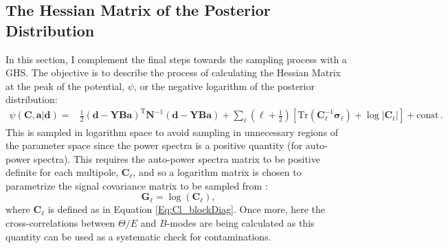 \subsection{The Hessian Matrix of the Posterior Distribution}\label{Sec:BPL:Hessian}
In this section, I complement the final steps towards the sampling process with a GHS. The objective is to describe the process of calculating the Hessian Matrix at the peak of the potential, $\psi$, or the negative logarithm of the posterior distribution: 
\begin{align}
\psi(\mathbf{C},\mathbf{a}|\mathbf{d}) = & \frac{1}{2}(\mathbf{d}-\mathbf{YBa})^{\mathrm{T}}\mathbf{N}^{-1}(\mathbf{d}-\mathbf{YBa})+\sum_{\ell}\left( {\ell}+\frac{1}{2}\right)\left[ \mathrm{Tr}(\mathbf{C}_{\ell}^{-1}\boldsymbol{\sigma}_{\ell}) + \log\left|\mathbf{C}_{\ell} \right|\right] + \mathrm{const}\, .
\end{align}
This is sampled in logarithm space to avoid sampling in unnecessary regions of the parameter space since the power spectra is a positive quantity (for auto-power spectra). This requires the auto-power spectra matrix to be positive definite for each multipole, $\mathbf{C}_{\ell}$, and so a logarithm matrix is chosen to parametrize the signal covariance matrix to be sampled from \citep{Taylor2008}:
\begin{equation}
\mathbf{G}_{\ell}=\log(\mathbf{C}_{\ell}),
\end{equation}
where $\mathbf{C}_{\ell}$ is defined as in Equation \eqref{Eq:Cl_blockDiag}. Once more, here the cross-correlations between $\Theta/E$ and $B$-modes are being calculated as this quantity can be used as a systematic check for contaminations.
